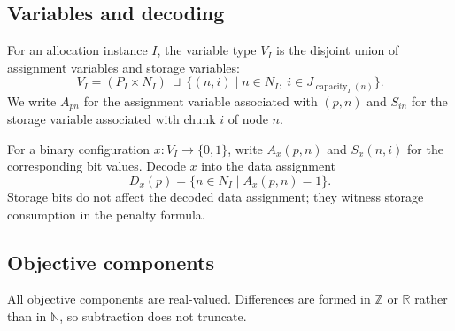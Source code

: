 \subsection{Variables and decoding}

\begin{definition}\label{def:allocation-variables}
For an allocation instance $I$, the variable type $V_I$ is the disjoint union
of assignment variables and storage variables:
\[
  V_I=(P_I\times N_I)\ \sqcup\
  \{(n,i)\mid n\in N_I,\ i\in J_{\operatorname{capacity}_I(n)}\}.
\]
We write $A_{pn}$ for the assignment variable associated with $(p,n)$ and
$S_{in}$ for the storage variable associated with chunk $i$ of node $n$.
\end{definition}

\begin{definition}\label{def:decode-assignment}
For a binary configuration $x:V_I\to\{0,1\}$, write $A_x(p,n)$ and $S_x(n,i)$
for the corresponding bit values. Decode $x$ into the data assignment
\[
  D_x(p)=\{n\in N_I\mid A_x(p,n)=1\}.
\]
Storage bits do not affect the decoded data assignment; they witness storage
consumption in the penalty formula.
\end{definition}

\subsection{Objective components}

All objective components are real-valued. Differences are formed in
$\mathbb{Z}$ or $\mathbb{R}$ rather than in $\mathbb{N}$, so subtraction does
not truncate.

